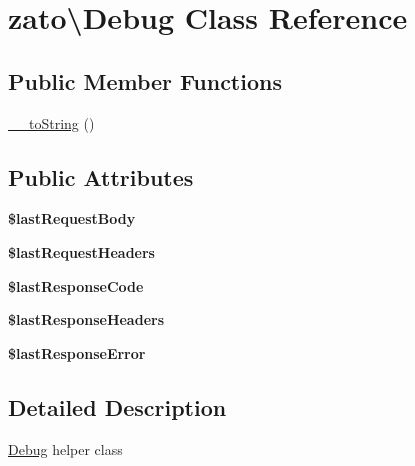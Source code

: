 \hypertarget{classzato_1_1_debug}{}\section{zato\textbackslash{}Debug Class Reference}
\label{classzato_1_1_debug}
\subsection*{Public Member Functions}
\begin{DoxyCompactItemize}
\item 
\hyperlink{classzato_1_1_debug_a01ed0dc4c3e81c721525f6279b9b8011}{\+\_\+\+\_\+to\+String} ()
\end{DoxyCompactItemize}
\subsection*{Public Attributes}
\begin{DoxyCompactItemize}
\item 
\hypertarget{classzato_1_1_debug_abd0eadf46c81fa5fb3bf8e3f21bfce4f}{}{\bfseries \$last\+Request\+Body}\label{classzato_1_1_debug_abd0eadf46c81fa5fb3bf8e3f21bfce4f}

\item 
\hypertarget{classzato_1_1_debug_ae38231e8bff154b3375749da4d89ce79}{}{\bfseries \$last\+Request\+Headers}\label{classzato_1_1_debug_ae38231e8bff154b3375749da4d89ce79}

\item 
\hypertarget{classzato_1_1_debug_a43220704abbc5503c3cee9ff854051a3}{}{\bfseries \$last\+Response\+Code}\label{classzato_1_1_debug_a43220704abbc5503c3cee9ff854051a3}

\item 
\hypertarget{classzato_1_1_debug_ae506058db00562d214b7961599a40fe6}{}{\bfseries \$last\+Response\+Headers}\label{classzato_1_1_debug_ae506058db00562d214b7961599a40fe6}

\item 
\hypertarget{classzato_1_1_debug_a1d8f7078a449b05b16335771c8807612}{}{\bfseries \$last\+Response\+Error}\label{classzato_1_1_debug_a1d8f7078a449b05b16335771c8807612}

\end{DoxyCompactItemize}


\subsection{Detailed Description}
\hyperlink{classzato_1_1_debug}{Debug} helper class 

